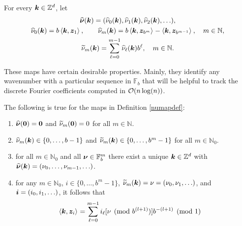 \documentclass[graybox]{svmult}
\newcommand{\Z}{\mathbb{Z}} %
\newcommand{\N}{\mathbb{N}} %
\newcommand{\F}{\mathbb{F}} %
\newcommand{\bszero}{\boldsymbol{0}} %
\newcommand{\bsz}{\boldsymbol{z}}    %
\begin{document}
\begin{definition} \label{numapdef} For every $\bsk \in \Z^d$, let
\begin{subequations} \label{numapdefeq}
\begin{gather}
\hbsnu(\bsk)=(\hnu_0(\bsk), \hnu_1(\bsk), \hnu_2(\bsk), \ldots ), \\
\hnu_0(\bsk) = b\ip{\bsk}{\bsz_{1}}, \qquad \hnu_m(\bsk)=b\ip{\bsk}{\bsz_{b^m}}-\ip{\bsk}{\bsz_{b^{m-1}}}, \quad m \in \N, \\
\tnu_m(\bsk) = \sum_{\ell=0}^{m-1} \hnu_{\ell}(\bsk) b^{\ell}, \quad m \in \N.
\end{gather}
\end{subequations}
\end{definition}

These maps have certain desirable properties. Mainly, they identify any wavenumber with a particular sequence in $\F_b$ that will be helpful to track the discrete Fourier coefficients computed in $\mathcal{O}(n\log(n))$.

\begin{lemma} \label{numaplem} The following is true for the maps in Definition \ref{numapdef}:
\begin{enumerate}
\item $\hbsnu(\bszero)=\bszero$ and $\tnu_m(\bszero) = 0$ for all $m \in \N$.
\item $\widehat{\nu}_m(\boldsymbol{k})\in \{0,\dots,b-1\}$ and $\widetilde{\nu}_m(\boldsymbol{k})\in \{0,\dots,b^m-1\}$ for all $m\in\N_0$.
\item for all $m\in \N_0$ and all $\bsnu \in \F_b^{m}$ there exist a unique $\bsk \in \Z^d$ with $\widehat{\boldsymbol{\nu}}(\boldsymbol{k})=(\nu_0, \ldots, \nu_{m-1}, \ldots)$.
\item for any $m \in \N_0$, $i \in \{0, \ldots, b^m-1\}$,  $\widetilde{\nu}_m(\boldsymbol{k})=\nu=(\nu_0, \nu_1, \ldots)$, and $\boldsymbol{i}=(i_0, i_1, \ldots)$, it follows that
\begin{align} \label{nuwisum}
\begin{split}
\ip{\bsk}{\bsz_i} &= \sum_{\ell=0}^{m-1} i_\ell [\nu \pmod  {b^{(l+1)}}]  b^{-(l+1)} \pmod 1
\end{split}
\end{align}

\end{enumerate}
\end{lemma}
\end{document}

